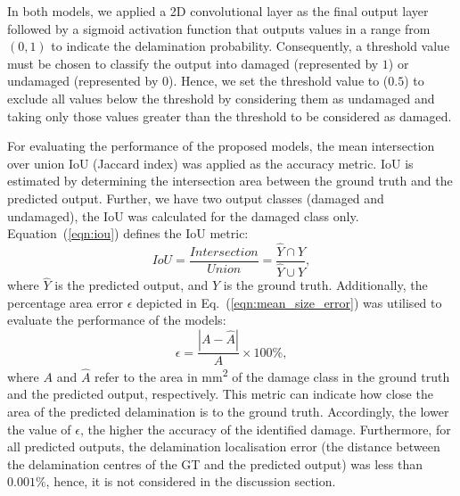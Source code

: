 \begin{sloppypar}
	In both models, we applied a 2D convolutional layer as the final output layer followed by a sigmoid activation function that outputs values in a range from \((0,1)\) to indicate the delamination probability.
	Consequently, a threshold value must be chosen to classify the output into damaged (represented by \(1\)) or undamaged (represented by \(0\)).
	Hence, we set the threshold value to (\(0.5\)) to exclude all values below the threshold by considering them as undamaged and taking only those values greater than the threshold to be considered as damaged.
	
	For evaluating the performance of the proposed models, the mean 
	intersection over union IoU (Jaccard index) was applied as the accuracy metric. 
	IoU is estimated by determining the intersection
	area between the ground truth and the predicted output. 
	Further, we have two output classes (damaged and undamaged), the IoU was calculated for the damaged class only. 
	Equation~(\ref{eqn:iou}) defines the IoU metric: 
	\begin{equation}
		IoU=\frac{Intersection}{Union}=\frac{\hat{Y} \cap Y}{\hat{Y} \cup Y},
		\label{eqn:iou}
	\end{equation}
	where \(\hat{Y}\) is the predicted output, and \(Y\) is the ground truth.
	Additionally, the percentage area error $\epsilon$ depicted in Eq.~(\ref{eqn:mean_size_error}) was utilised to evaluate the performance of the models:
	\begin{equation}
		\epsilon=\frac{|A-\hat{A}|}{A} \times 100\%,
		\label{eqn:mean_size_error}
	\end{equation}
	where \(A\) and \(\hat{A}\) refer to the area in mm\textsuperscript{2} of the damage class in the ground truth and the predicted output, respectively.
	This metric can indicate how close the area of the predicted delamination is to the ground truth.
	Accordingly, the lower the value of $\epsilon$, the higher the accuracy of the identified damage. 
	Furthermore, for all predicted outputs, the delamination localisation error (the distance between the delamination centres of the GT and the predicted output) was less than \(0.001\%\), hence, it is not considered in the discussion section.
\end{sloppypar}
